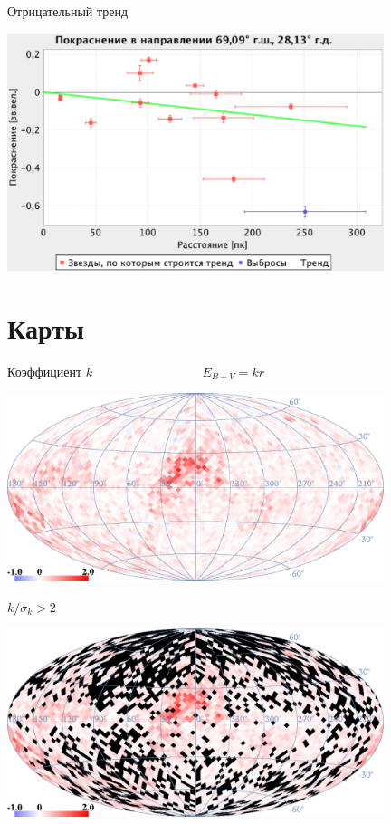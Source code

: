 \documentclass[14pt, fleqn, xcolor={dvipsnames, table}]{beamer}
\begin{document}
        \begin{frame}{Отрицательный тренд}
            \begin{center}
                \includegraphics[width=11cm]{real-4-k.eps}
            \end{center}             
        \end{frame}
        
    \section{Карты}            
        
        \begin{frame}{Коэффициент $k$ ~~~~~~~~~~~~~~~~ $E_{B - V} = k r$}
            \begin{center}
                \includegraphics[width=11cm]{map-k.eps}
            \end{center}             
        \end{frame}
        
        \begin{frame}{$k / \sigma_k > 2$}
            \begin{center}
                \includegraphics[width=11cm]{map-k-2sigma.eps}
            \end{center}             
        \end{frame}
        
\end{document}
